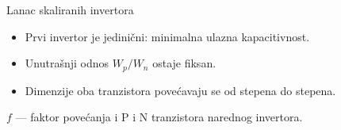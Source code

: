 \begin{frame}[label=09_3-s015]{Lanac skaliranih invertora}
\begin{itemize}
\item Prvi invertor je jedinični: \alert{minimalna ulazna kapacitivnost}.
\item Unutrašnji odnos $W_p/W_n$ ostaje fiksan.
\item Dimenzije oba tranzistora povećavaju se od stepena do stepena.
\end{itemize}\begin{center}

\end{center}$f$ — faktor povećanja i P i N tranzistora narednog invertora.
\end{frame}
